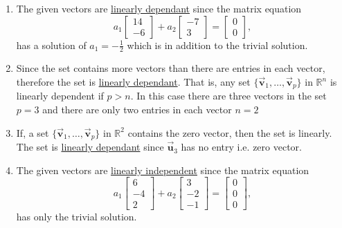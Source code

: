 \documentclass[letter,11pt]{article}
\begin{document}
\begin{tcolorbox}[boxrule=1mm, width=(.9\linewidth),before=\hfill,after=\hfill,adjusted title={Problem \#1 Solutions}]
\begin{enumerate}[label = \roman*.]
    \item The given vectors are \underline{linearly dependant} since the matrix equation $$a_{1}\begin{bmatrix}14 \\ -6\end{bmatrix}+ a_{2}\begin{bmatrix}-7 \\ 3\end{bmatrix}=\begin{bmatrix} 0\\0\end{bmatrix},$$ has a solution of $a_1=-\frac{1}{2}$ which is in addition to the trivial solution.
    \item Since the set contains more vectors than there are entries in each vector, therefore the set is \underline{linearly dependant}. That is, any set  $\{\vec{\boldsymbol{v}}_{1}, \ldots, \vec{\boldsymbol{v}}_{p}\}$ in $\mathbb{R}^{n}$ is linearly dependent if $p > n$. In this case there are three vectors in the set $p = 3$ and there are only two entries in each vector $n=2$
    \item If, a set $\{\vec{\boldsymbol{v}}_{1}, \ldots, \vec{\boldsymbol{v}}_{p}\}$ in $\mathbb{R}^2$ contains the zero vector, then the set is linearly. The set is \underline{linearly dependant} since $\vec{\boldsymbol{u}}_{3}$ has no entry i.e. zero vector.
    \item The given vectors are \underline{linearly independent} since the matrix equation $$a_{1}\begin{bmatrix}6 \\ -4\\2\end{bmatrix}+ a_{2}\begin{bmatrix}3 \\ -2\\-1\end{bmatrix}=\begin{bmatrix} 0\\0\\0\end{bmatrix},$$ has only the trivial solution.
    
\end{enumerate}

\end{tcolorbox}
\end{document}
